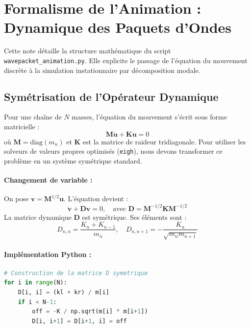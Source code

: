 \documentclass[11pt, a4paper]{report}
\begin{document}
\section{Formalisme de l'Animation : Dynamique des Paquets d'Ondes}

Cette note détaille la structure mathématique du script \texttt{wavepacket\_animation.py}. Elle explicite le passage de l'équation du mouvement discrète à la simulation instationnaire par décomposition modale.

\subsection{Symétrisation de l'Opérateur Dynamique}

Pour une chaîne de $N$ masses, l'équation du mouvement s'écrit sous forme matricielle :
\begin{equation}
    \mathbf{M} \mathbf{\ddot{u}} + \mathbf{K} \mathbf{u} = 0
\end{equation}
où $\mathbf{M} = \text{diag}(m_n)$ et $\mathbf{K}$ est la matrice de raideur tridiagonale. Pour utiliser les solveurs de valeurs propres optimisés (\texttt{eigh}), nous devons transformer ce problème en un système symétrique standard.

\paragraph{Changement de variable :} 
On pose $\mathbf{v} = \mathbf{M}^{1/2} \mathbf{u}$. L'équation devient :
\begin{equation}
    \mathbf{\ddot{v}} + \mathbf{D} \mathbf{v} = 0, \quad \text{avec } \mathbf{D} = \mathbf{M}^{-1/2} \mathbf{K} \mathbf{M}^{-1/2}
\end{equation}
La matrice dynamique $\mathbf{D}$ est symétrique. Ses éléments sont :
\begin{equation}
    D_{n,n} = \frac{K_n + K_{n-1}}{m_n}, \quad D_{n,n+1} = -\frac{K_n}{\sqrt{m_n m_{n+1}}}
\end{equation}

\paragraph{Implémentation Python :}
\begin{lstlisting}[language=Python]
# Construction de la matrice D symetrique
for i in range(N):
    D[i, i] = (kl + kr) / m[i]
    if i < N-1:
        off = -K / np.sqrt(m[i] * m[i+1])
        D[i, i+1] = D[i+1, i] = off
\end{lstlisting}
\end{document}
